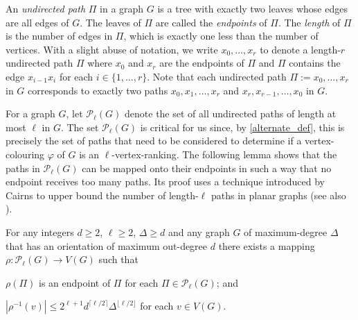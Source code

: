 \documentclass{patmorin}
\newcommand{\defin}[1]{\emph{\color{brightmaroon}#1}}
\begin{document}
An \defin{undirected path} $\Pi$ in a graph $G$ is a tree with exactly two leaves whose edges are all edges of $G$. The leaves of $\Pi$ are called the \defin{endpoints} of $\Pi$. The \defin{length} of $\Pi$ is the number of edges in $\Pi$, which is exactly one less than the number of vertices.  With a slight abuse of notation, we write $x_0,\ldots,x_r$ to denote a length-$r$ undirected path $\Pi$ where $x_0$ and $x_r$ are the endpoints of $\Pi$ and $\Pi$ contains the edge $x_{i-1}x_i$ for each $i\in\{1,\ldots,r\}$.  Note that each undirected path $\Pi:=x_0,\ldots,x_r$ in $G$ corresponds to exactly two paths $x_0,x_1,\ldots,x_r$ and $x_r,x_{r-1},\ldots,x_0$ in $G$.

For a graph $G$, let $\mathcal{P}_\ell(G)$ denote the set of all undirected paths of length at most $\ell$ in $G$.  The set $\mathcal{P}_\ell(G)$ is critical for us since, by \cref{alternate_def}, this is precisely the set of paths that need to be considered to determine if a vertex-colouring $\varphi$ of $G$ is an $\ell$-vertex-ranking.  The following lemma shows that the paths in $\mathcal{P}_\ell(G)$ can be mapped onto their endpoints in such a way that no endpoint receives too many paths.  Its proof uses a technique introduced by Cairns to upper bound the number of length-$\ell$ paths in planar graphs (see also \cite[Lemma~5]{devroye.dujmovic.ea:notes}).

\begin{lem}\label{advanced_cairns}
  For any integers $d\ge 2$, $\ell\ge 2$, $\Delta\ge d$ and any
  graph $G$ of maximum-degree $\Delta$ that has an orientation of maximum out-degree $d$ there exists a mapping $\rho:\mathcal{P}_\ell(G)\to V(G)$ such that
  \begin{compactenum}[(i)]
    \item $\rho(\Pi)$ is an endpoint of $\Pi$ for each $\Pi\in\mathcal{P}_\ell(G)$; and
    \item $|\rho^{-1}(v)| \le 2^{\ell+1}d^{\lceil \ell/2\rceil}\Delta^{\lfloor\ell/2\rfloor}$ for each $v\in V(G)$.
  \end{compactenum}
\end{lem}
\end{document}
